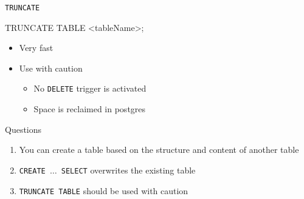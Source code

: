 \documentclass[aspectratio=169]{beamer}
\begin{document}
\begin{frame}[fragile]{\texttt{TRUNCATE}}

\begin{SQL}
TRUNCATE TABLE <tableName>;
\end{SQL}


\begin{itemize}
\item Very fast
\item Use with caution
\begin{itemize}
\item No \texttt{DELETE} trigger is activated
\item Space is reclaimed in postgres
\end{itemize}
\end{itemize}



\end{frame}
\begin{frame}{Questions}
\begin{enumerate}
\item You can create a table based on the structure and content of another table %
\item \texttt{CREATE $\ldots$ SELECT} overwrites the existing table %
\item \texttt{TRUNCATE TABLE} should be used with caution
\end{enumerate}
\end{frame}
\end{document}
